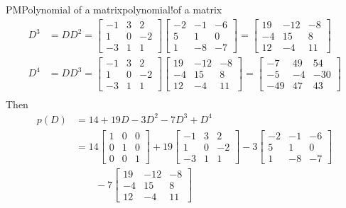 \begin{example}{PM}{Polynomial of a matrix}{polynomial!of a matrix}
\begin{align*}
%
D^3&=DD^2=
\begin{bmatrix}-1 & 3 & 2\\1 & 0 & -2\\-3 & 1 & 1\end{bmatrix}
\begin{bmatrix}-2 & -1 & -6\\5 & 1 & 0\\1 & -8 & -7\end{bmatrix}
=
\begin{bmatrix}19 & -12 & -8\\-4 & 15 & 8\\12 & -4 & 11\end{bmatrix}\\
%
D^4&=DD^3=
\begin{bmatrix}-1 & 3 & 2\\1 & 0 & -2\\-3 & 1 & 1\end{bmatrix}
\begin{bmatrix}19 & -12 & -8\\-4 & 15 & 8\\12 & -4 & 11\end{bmatrix}
=
\begin{bmatrix}-7 & 49 & 54\\-5 & -4 & -30\\-49 & 47 & 43\end{bmatrix}\\
%
\end{align*}
%
Then
%
\begin{align*}
p(D)&=14+19D-3D^2-7D^3+D^4\\
&=
  14\begin{bmatrix}1 & 0 & 0\\0 & 1 & 0\\0 & 0 & 1\end{bmatrix}
+19\begin{bmatrix}-1 & 3 & 2\\1 & 0 & -2\\-3 & 1 & 1\end{bmatrix}
   -3\begin{bmatrix}-2 & -1 & -6\\5 & 1 & 0\\1 & -8 & -7\end{bmatrix}\\
&\quad\quad   
   -7\begin{bmatrix}19 & -12 & -8\\-4 & 15 & 8\\12 & -4 & 11\end{bmatrix}

\end{align*}
\end{example}
